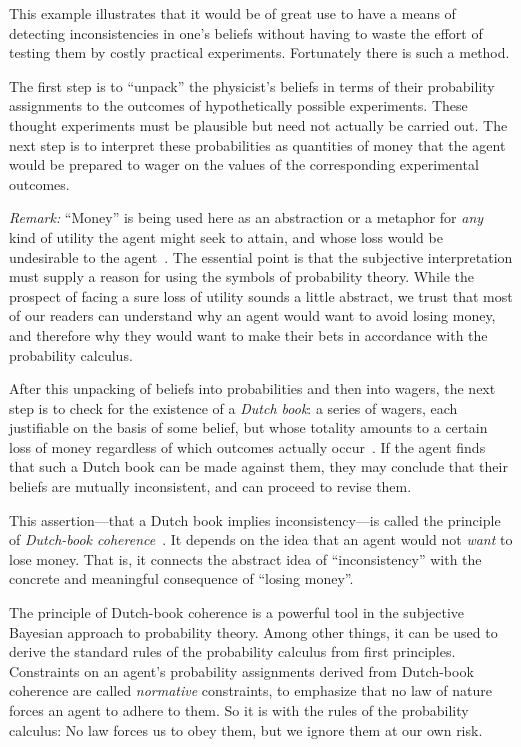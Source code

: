 \documentclass[%
 reprint,superscriptaddress,
 amsmath,amssymb,
 aps,pra, onecolumn, 12pt
]{revtex4-2}
\newcommand{\tit}[1]{\textit{#1}}
\begin{document}
This example illustrates that it would be of great use to have a means of detecting inconsistencies in one's beliefs without having to waste the effort of testing them by costly practical experiments. Fortunately there is such a method.

The first step is to ``unpack'' the physicist's beliefs in terms of their probability assignments to the outcomes of hypothetically possible experiments. These thought experiments must be plausible but need not actually be carried out. The next step is to interpret these probabilities as quantities of money that the agent would be prepared to wager on the values of the corresponding experimental outcomes.

\tit{Remark:} ``Money'' is being used here as an abstraction or a metaphor for \tit{any} kind of utility the agent might seek to attain, and whose loss would be undesirable to the agent~\cite{BernardoSmith1994}. The essential point is that the subjective interpretation must supply a reason for using the symbols of probability theory. While the prospect of facing a sure loss of utility sounds a little abstract, we trust that most of our readers can understand why an agent would want to avoid losing money, and therefore why they would want to make their bets in accordance with the probability calculus.

After this unpacking of beliefs into probabilities and then into wagers, the next step is to check for the existence of a \tit{Dutch book}: a series of wagers, each justifiable on the basis of some belief, but whose totality amounts to a certain loss of money regardless of which outcomes actually occur~\cite{deFinetti1990, MISAK}. If the agent finds that such a Dutch book can be made against them, they may conclude that their beliefs are mutually inconsistent, and can proceed to revise them.

This assertion---that a Dutch book implies inconsis\-tency---is called the principle of \tit{Dutch-book coherence}~\cite{deFinetti1990}. It depends on the idea that an agent would not \tit{want} to lose money. That is, it connects the abstract idea of ``inconsistency'' with the concrete and meaningful consequence of ``losing money''.

The principle of Dutch-book coherence is a powerful tool in the subjective Bayesian approach to probability theory. Among other things, it can be used to derive the standard rules of the probability calculus from first principles. Constraints on an agent's probability assignments derived from Dutch-book coherence are called \tit{normative} constraints, to emphasize that no law of nature forces an agent to adhere to them. So it is with the rules of the probability calculus: No law forces us to obey them, but we ignore them at our own risk.
\end{document}
